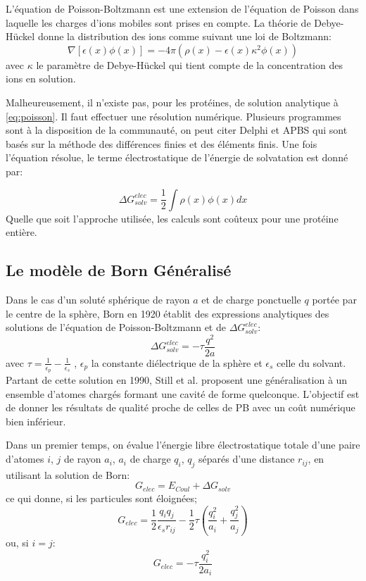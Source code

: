 L'équation de Poisson-Boltzmann est une extension de l'équation de Poisson dans laquelle les charges d'ions mobiles sont prises en compte. La théorie de Debye-Hückel donne la distribution des ions comme suivant une loi de Boltzmann:
\begin{equation}
  \nabla [ \epsilon (x) \phi(x)] = -4 \pi ( \rho(x) - \epsilon(x) \kappa^2 \phi(x))
\end{equation}
avec $ \kappa $ le paramètre de Debye-Hückel qui tient compte de la concentration des ions en solution.

Malheureusement, il n'existe pas, pour les protéines, de solution analytique à \ref{eq:poisson}. Il faut effectuer une résolution numérique. Plusieurs programmes sont à la disposition de la communauté, on peut citer Delphi \cite{Rocchia02} et APBS \cite{Baker01}  qui sont basés sur la méthode des différences finies et des éléments finis. Une fois l'équation résolue, le terme électrostatique de l'énergie de solvatation est donné par:

\begin{equation}
\Delta G_{solv}^{elec} = \frac{1}{2} \int \rho(x)\phi(x)dx  
\end{equation}
Quelle que soit l'approche utilisée, les calculs sont coûteux pour une protéine entière.


\subsection{Le modèle de Born Généralisé}
\label{sub:GB}
Dans le cas d'un soluté sphérique de rayon $a$ et de charge ponctuelle $q$ portée par le centre de la sphère, Born en 1920 \cite{Born20} établit des expressions analytiques des solutions de l'équation de Poisson-Boltzmann et de $ \Delta G_{solv}^{elec}$:
\begin{equation}
  \label{eq:Born}
  \Delta G_{solv}^{elec} = - \tau \frac{q^2}{2a}
\end{equation}
avec $ \tau = \frac{1}{\epsilon_p} - \frac{1}{\epsilon_s}$ , $\epsilon_p$ la constante diélectrique de la sphère et $\epsilon_s$ celle du solvant. Partant de cette solution en 1990, Still et al. \cite{Still90} proposent une généralisation à un ensemble d'atomes chargés formant une cavité de forme quelconque. L'objectif est de donner les résultats de qualité proche de celles de PB avec un coût numérique bien inférieur.

Dans un premier temps, on évalue l'énergie libre électrostatique totale d'une paire d'atomes $i$, $j$ de rayon $a_i$, $a_i$ de charge $q_i$, $q_j$ séparés d'une distance $r_{ij}$, en utilisant la solution de Born:
\begin{equation}
  \label{eq:GB}
  G_{elec} =  E_{Coul} + \Delta G_{solv}
\end{equation}
ce qui donne, si les particules sont éloignées;
\begin{equation}
  \label{eq:GB2}
  G_{elec} =  \frac{1}{2}  \frac{q_iq_j}{\epsilon_s r_{ij}} - \frac{1}{2}  \tau ( \frac{q_i^2}{a_i} +  \frac{q_j^2}{a_j})  
\end{equation}
ou, si $i=j$:
\begin{equation}
  G_{elec} = - \tau \frac{q_i^2}{2a_i}
\end{equation}

